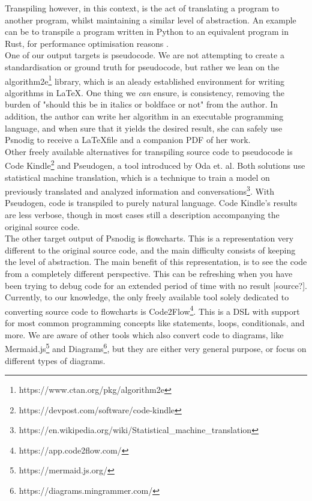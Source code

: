 Transpiling however, in this context, is the act of translating a program to another program, whilst maintaining a similar level of abstraction. An example can be to transpile a program written in Python to an equivalent program in Rust, for performance optimisation reasons \cite{DBLP:conf/samos/LunnikiviJ020}. \hfill \\

One of our output targets is pseudocode. We are not attempting to create a standardisation or ground truth for pseudocode, but rather we lean on the algorithm2e\footnote{https://www.ctan.org/pkg/algorithm2e} library, which is an aleady established environment for writing algorithms in \LaTeX. One thing we \textit{can} ensure, is consistency, removing the burden of "should this be in italics or boldface or not" from the author. In addition, the author can write her algorithm in an executable programming language, and when sure that it yields the desired result, she can safely use Psnodig to receive a \LaTeX file and a companion PDF of her work. \hfill \\

Other freely available alternatives for transpiling source code to pseudocode is Code Kindle\footnote{https://devpost.com/software/code-kindle} and Pseudogen, a tool introduced by Oda et. al\cite{DBLP:conf/kbse/OdaFNHSTN15}. Both solutions use statistical machine translation, which is a technique to train a model on previously translated and analyzed information and conversations\footnote{https://en.wikipedia.org/wiki/Statistical\_machine\_translation}. With Pseudogen, code is transpiled to purely natural language. Code Kindle's results are less verbose, though in most cases still a description accompanying the original source code. \hfill \\

The other target output of Psnodig is flowcharts. This is a representation very different to the original source code, and the main difficulty consists of keeping the level of abstraction. The main benefit of this representation, is to see the code from a completely different perspective. This can be refreshing when you have been trying to debug code for an extended period of time with no result [source?]. \hfill \\

Currently, to our knowledge, the only freely available tool solely dedicated to converting source code to flowcharts is Code2Flow\footnote{https://app.code2flow.com/}. This is a DSL with support for most common programming concepts like statements, loops, conditionals, and more. We are aware of other tools which also convert code to diagrams, like Mermaid.js\footnote{https://mermaid.js.org/} and Diagrams\footnote{https://diagrams.mingrammer.com/}, but they are either very general purpose, or focus on different types of diagrams. \hfill \\

